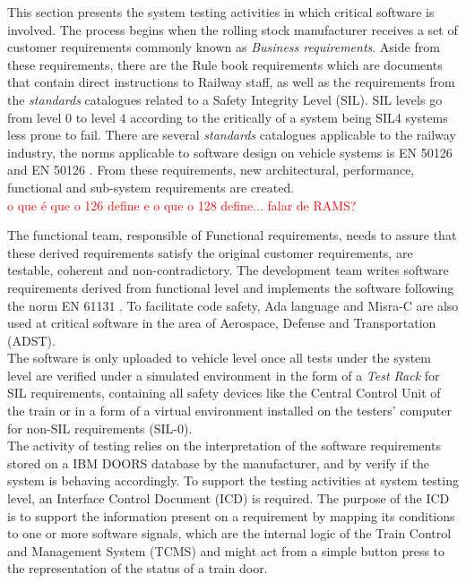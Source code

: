 This section presents the system testing activities in which critical software is involved.
The process begins when the rolling stock manufacturer receives a set of customer requirements commonly known as \textit{Business requirements}. Aside from these requirements, there are the Rule book requirements which are documents that contain direct instructions to Railway staff, as well as the requirements from the \textit{standards} catalogues related to a Safety Integrity Level (SIL). SIL levels go from level 0 to level 4 according to the critically of a system being SIL4 systems less prone to fail. There are several \textit{standards} catalogues applicable to the railway industry, the norms applicable to software design on vehicle systems is EN 50126 \cite{en50126} and EN 50126 \cite{en50128}. From these requirements, new architectural, performance, functional and sub-system requirements are created.\\

\textcolor{red}{o que é que o 126 define e o que o 128 define... falar de RAMS?}

The functional team, responsible of Functional requirements, needs to assure that these derived requirements satisfy the original customer requirements, are testable, coherent and non-contradictory. The development team writes software requirements derived from functional level and implements the software following the norm EN 61131 \cite{en61131}. To facilitate code safety, Ada language and Misra-C are also used at critical software in the area of Aerospace, Defense and Transportation (ADST).\\

The software is only uploaded to vehicle level once all tests under the system level are verified under a simulated environment in the form of a \textit{Test Rack} for SIL requirements, containing all safety devices like the Central Control Unit of the train or in a form of a virtual environment installed on the testers' computer for non-SIL requirements (SIL-0). \\

The activity of testing relies on the interpretation of the software requirements stored on a IBM DOORS database by the manufacturer, and by verify if the system is behaving accordingly. To support the testing activities at system testing level, an Interface Control Document (ICD) is required. The purpose of the ICD is to support the information present on a requirement by mapping its conditions to one or more software signals, which are the internal logic of the Train Control and Management System (TCMS) and might act from a simple button press to the representation of the status of a train door.\\

